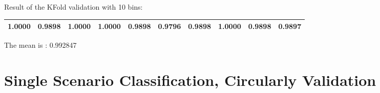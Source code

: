 Result of the KFold validation with 10 bins:
 {\def\arraystretch{1.3} 
 \begin{table}[H] 
\centering 
\begin{tabular}{|l |l |l |l |l |l |l |l |l |l |}  
\hline 
1.0000&
0.9898&
1.0000&
1.0000&
0.9898&
0.9796&
0.9898&
1.0000&
0.9898&
0.9897\\ \hline  

\end{tabular} 
\end{table} }

The mean is : 0.992847

\chapter{Single Scenario Classification, Circularly Validation}

